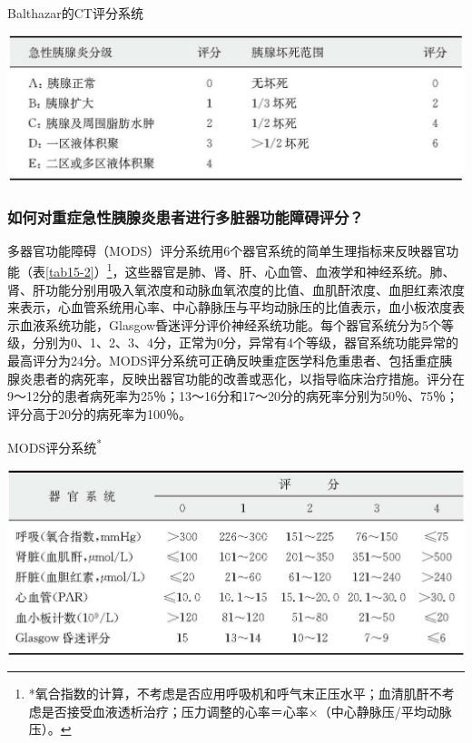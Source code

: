 \begin{table}[htbp]
\centering
\caption{Balthazar的CT评分系统}
\label{tab15-1}
\includegraphics{./images/Image00114.jpg}
\end{table}

\subsubsection{如何对重症急性胰腺炎患者进行多脏器功能障碍评分？}

多器官功能障碍（MODS）评分系统用6个器官系统的简单生理指标来反映器官功能（表\ref{tab15-2}）\footnote{*氧合指数的计算，不考虑是否应用呼吸机和呼气末正压水平；血清肌酐不考虑是否接受血液透析治疗；压力调整的心率＝心率×（中心静脉压/平均动脉压）。}，这些器官是肺、肾、肝、心血管、血液学和神经系统。肺、肾、肝功能分别用吸入氧浓度和动脉血氧浓度的比值、血肌酐浓度、血胆红素浓度来表示，心血管系统用心率、中心静脉压与平均动脉压的比值表示，血小板浓度表示血液系统功能，Glasgow昏迷评分评价神经系统功能。每个器官系统分为5个等级，分别为0、1、2、3、4分，正常为0分，异常有4个等级，器官系统功能异常的最高评分为24分。MODS评分系统可正确反映重症医学科危重患者、包括重症胰腺炎患者的病死率，反映出器官功能的改善或恶化，以指导临床治疗措施。评分在9～12分的患者病死率为25％；13～16分和17～20分的病死率分别为50％、75％；评分高于20分的病死率为100％。

\begin{table}[htbp]
\centering
\caption{MODS评分系统\textsuperscript{*}}
\label{tab15-2}
\includegraphics{./images/Image00115.jpg}
\end{table}



